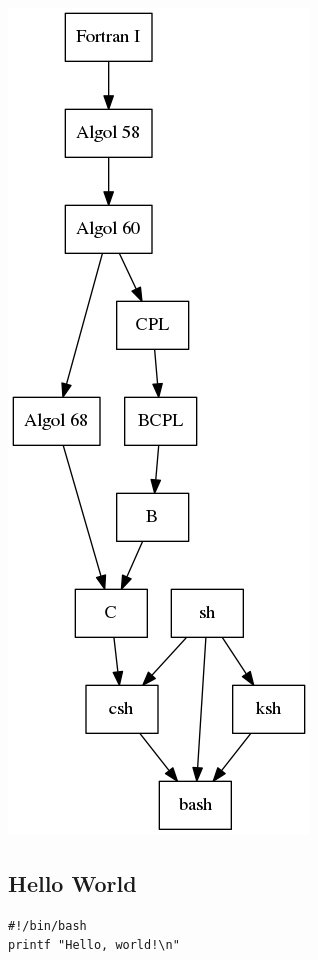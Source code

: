 \documentclass[../Languages.tex]{subfiles}
\begin{document}
\begin{Figure}
   \centering
   \includegraphics[height=0.5\textheight]{bash}
\end{Figure}

\subsection{Hello World}
\label{sub:hello_world}

\begin{verbatim}
#!/bin/bash
printf "Hello, world!\n"
\end{verbatim}

\newpage
\end{document}
